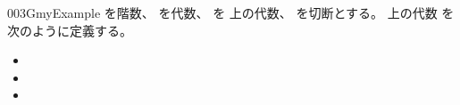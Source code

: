 \documentclass[index]{subfiles}
\begin{document}
\begin{myBlock}{003G}{myExample}
  を階数、
  を\myInlineMath{\myNat}代数、
  を
  上の\myInlineMath{\myNat}代数、
  を切断とする。
  上の\myInlineMath{\myNat}代数
  を次のように定義する。
  \begin{itemize}
  \item {}
  \item {}
  \item {}
  \end{itemize}
\end{myBlock}
\end{document}
